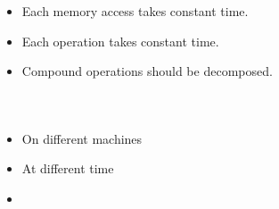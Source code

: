 \begin{frame}{}
  \begin{center}
    \href{https://www8.cs.umu.se/kurser/TDBA77/VT06/algorithms/BOOK/BOOK/NODE12.HTM}{}
  \end{center}

  \begin{columns}
      \begin{itemize}
        \setlength{\itemsep}{6pt}
        \item Each memory access takes constant time.
        \item Each  operation takes constant time.
        \item Compound operations should be decomposed.
      \end{itemize}
  \end{columns}

  \pause
  \vspace{0.60cm}
  \begin{center}
  \end{center}
\end{frame}

\begin{frame}{}
  \begin{columns}
      \begin{itemize}
        \setlength{\itemsep}{6pt}
        \item On different machines
        \item At different time
        \item {}
      \end{itemize}
  \end{columns}

  \pause
  \vspace{0.60cm}
  \begin{center}
     \\[5pt]
     \\[5pt]
  \end{center}
\end{frame}

